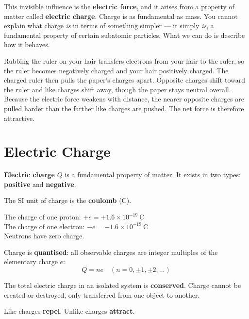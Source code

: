 This invisible influence is the \textbf{electric force},
and it arises from a property of matter called
\textbf{electric charge}. Charge is as fundamental as
mass. You cannot explain what charge \textit{is} in
terms of something simpler --- it simply \textit{is},
a fundamental property of certain subatomic particles.
What we can do is describe how it behaves.

Rubbing the ruler on your hair transfers electrons from your hair
to the ruler, so the ruler becomes negatively charged and your hair
positively charged. The charged ruler then pulls the paper's charges
apart. Opposite charges shift toward the ruler and like charges shift
away, though the paper stays neutral overall. Because the electric
force weakens with distance, the nearer opposite charges are pulled
harder than the farther like charges are pushed. The net force is
therefore attractive.

\section{Electric Charge}

\begin{definitionbox}
\textbf{Electric charge} $Q$ is a fundamental property
of matter. It exists in two types: \textbf{positive}
and \textbf{negative}.

The SI unit of charge is the \textbf{coulomb} (C).

The charge of one proton: $+e = +1.6\times10^{-19}\ \text{C}$\\
The charge of one electron: $-e = -1.6\times10^{-19}\ \text{C}$\\
Neutrons have zero charge.

Charge is \textbf{quantised}: all observable charges
are integer multiples of the elementary charge $e$:
\[
  Q = ne \quad (n = 0, \pm1, \pm2, \ldots)
\]
\end{definitionbox}

\begin{lawbox}
The total electric charge in an isolated system is
\textbf{conserved}. Charge cannot be created or
destroyed, only transferred from one object to another.

Like charges \textbf{repel}. Unlike charges
\textbf{attract}.
\end{lawbox}

